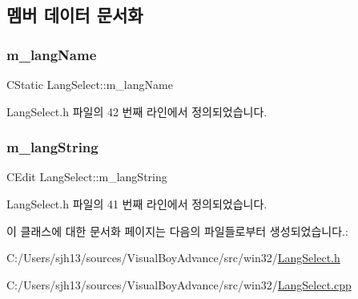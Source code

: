 \subsection{멤버 데이터 문서화}
\mbox{\label{class_lang_select_ab18b546f12c8230292959ce2258ef240}} 
\subsubsection{\texorpdfstring{m\+\_\+lang\+Name}{m\_langName}}
{\footnotesize\ttfamily C\+Static Lang\+Select\+::m\+\_\+lang\+Name}



Lang\+Select.\+h 파일의 42 번째 라인에서 정의되었습니다.

\mbox{\label{class_lang_select_af75ddf60623799cb4c761692a8057b46}} 
\subsubsection{\texorpdfstring{m\+\_\+lang\+String}{m\_langString}}
{\footnotesize\ttfamily C\+Edit Lang\+Select\+::m\+\_\+lang\+String}



Lang\+Select.\+h 파일의 41 번째 라인에서 정의되었습니다.



이 클래스에 대한 문서화 페이지는 다음의 파일들로부터 생성되었습니다.\+:\begin{DoxyCompactItemize}
\item 
C\+:/\+Users/sjh13/sources/\+Visual\+Boy\+Advance/src/win32/\mbox{\hyperlink{_lang_select_8h}{Lang\+Select.\+h}}\item 
C\+:/\+Users/sjh13/sources/\+Visual\+Boy\+Advance/src/win32/\mbox{\hyperlink{_lang_select_8cpp}{Lang\+Select.\+cpp}}\end{DoxyCompactItemize}
